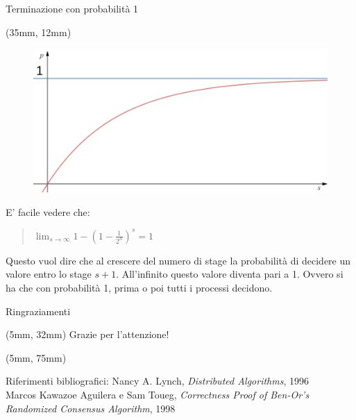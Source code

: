 \documentclass{beamer}
\begin{document}
\begin{frame}{Terminazione con probabilità 1}
    \begin{textblock*}{\textwidth}(35mm, 12mm)
        \begin{figure}
            \centering
            \includegraphics[scale = 0.25]{funzione_p_piccola.png}
        \end{figure}
    \end{textblock*}
    E' facile vedere che:
    \begin{quote}   
        \vspace{0.3cm}
        \Large
        $\lim_{s\to\infty} 1 - (1 - \frac{1}{2^n})^s = 1$
        \vspace{0.3cm}
    \end{quote}
    Questo vuol dire che al crescere del numero di stage la probabilità di decidere un valore entro lo stage $s+1$. \newline \newline
    All'infinito questo valore diventa pari a 1. Ovvero si ha che con probabilità 1, prima o poi tutti i processi decidono.
\end{frame}

{
    \beamertemplatenavigationsymbolsempty
    \begin{frame}{Ringraziamenti}
    \begin{textblock*}{\textwidth}(5mm, 32mm)
        \Huge Grazie per l'attenzione!
    \end{textblock*}
    \begin{textblock*}{0.6\textwidth}(5mm, 75mm)
        \begin{block}{Riferimenti bibliografici:}
            \tiny Nancy A. Lynch, \textit{Distributed Algorithms}, 1996 \\
            Marcos Kawazoe Aguilera e Sam Toueg, \textit{Correctness Proof of Ben-Or’s Randomized Consensus Algorithm}, 1998
        \end{block}
    \end{textblock*}
    \end{frame}
    \addtocounter{framenumber}{-1}
}
\end{document}
